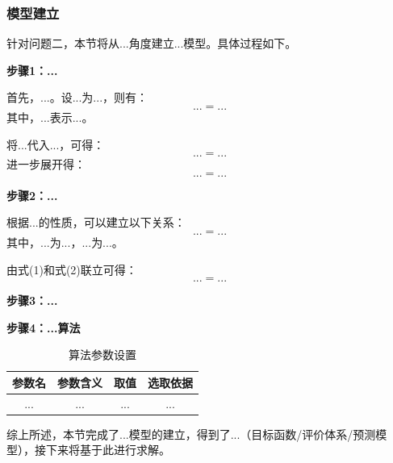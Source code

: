 
\subsubsection{模型建立}

针对问题二，本节将从...角度建立...模型。具体过程如下。

\textbf{步骤1：...}

首先，...。设...为...，则有：
\begin{equation}
    ... = ...
\end{equation}
其中，$...$表示...。

将...代入...，可得：
\begin{equation}
    ... = ...
\end{equation}
进一步展开得：
\begin{equation}
    ... = ...
\end{equation}

\textbf{步骤2：...}

根据...的性质，可以建立以下关系：
\begin{equation}
    ... = ...
\end{equation}
其中，$...$为...，$...$为...。

由式(1)和式(2)联立可得：
\begin{equation}
    ... = ...
\end{equation}

\textbf{步骤3：...}


\textbf{步骤4：...算法}


\begin{table}[H]
  \centering
  \caption{算法参数设置}
  \begin{tabularx}{\textwidth}{CCCC}
    \toprule
    参数名 & 参数含义 & 取值 & 选取依据 \\
    \midrule
    ... & ... & ... & ... \\
    \bottomrule
  \end{tabularx}
  \label{tab:参数2}
\end{table}

综上所述，本节完成了...模型的建立，得到了...（目标函数/评价体系/预测模型），接下来将基于此进行求解。

